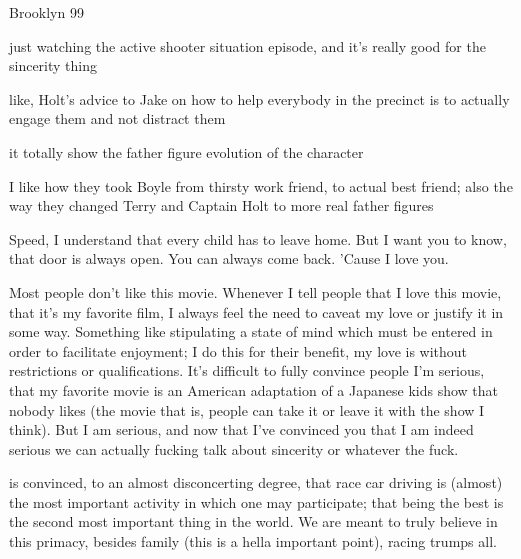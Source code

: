 \documentclass[../butidigress.tex]{subfiles}
\begin{document}


\begin{somenotes}{Brooklyn 99}
    \item just watching the active shooter situation episode, and it's really good for the sincerity thing
    \item like, Holt's advice to Jake on how to help everybody in the precinct is to actually engage them and not distract them
    \item it totally show the father figure evolution of the character
    \item I like how they took Boyle from thirsty work friend, to actual best friend; also the way they changed Terry and Captain Holt to more real father figures
\end{somenotes}

\epigraph{Speed, I understand that every child has to leave home. But I want you to know, that door is always open. You can always come back. 'Cause I love you.}{}

Most people don't like this movie.
Whenever I tell people that I love this movie, that it's my favorite film, I always feel the need to caveat my love or justify it in some way.
Something like stipulating a state of mind which must be entered in order to facilitate enjoyment; I do this for their benefit, my love is without restrictions or qualifications.
It's difficult to fully convince people I'm serious, that my favorite movie is an American adaptation of a Japanese kids show that nobody likes (the movie that is, people can take it or leave it with the show I think).
But I am serious, and now that I've convinced you that I am indeed serious we can actually fucking talk about sincerity or whatever the fuck.

 is convinced, to an almost disconcerting degree, that race car driving is (almost) the most important activity in which one may participate; that being the best is the second most important thing in the world.
We are meant to truly believe in this primacy, besides family (this is a hella important point), racing trumps all.
\end{document}

